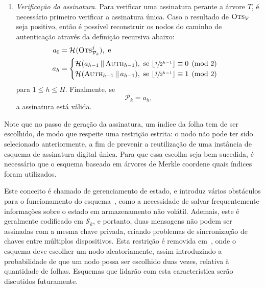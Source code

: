 \documentclass{ufsctex/ufsctex}
\newcommand{\pk}{\mathcal{P}_k}
\newcommand{\sk}{\mathcal{S}_k}
\newcommand{\hash}[2][]{\mathcal{H}^{#1} (#2)}
\newcommand{\concat}{\, \vert{} \vert{} \,}
\begin{document}
\begin{enumerate}
  \item[] \emph{Verificação da assinatura.} Para verificar uma assinatura
      perante a árvore $T$, é necessário primeiro verificar a assinatura única.
        Caso o resultado de $\textsc{Ots}_{\mathcal{V}}$ seja positivo, então é
        possível reconstruir os nodos do caminho de autenticação através da
        definição recursiva abaixo:
        \begin{equation}
          \begin{split}
            a_{0} &= \hash{\textsc{Ots}_{\pk{}}^{j}}, \text{ e } \\
            a_{h} &=
            \begin{cases}
              \hash{a_{h - 1} \concat \textsc{Auth}_{h - 1}}, \text{ se }
                \lfloor \sfrac{j}{2^{h - 1}} \rfloor \equiv 0 \pmod{2} \\
              \hash{\textsc{Auth}_{h - 1} \concat a_{h - 1}}, \text{ se }
                \lfloor \sfrac{j}{2^{h - 1}} \rfloor \equiv 1 \pmod{2} \\
            \end{cases}
          \end{split}
        \end{equation}
        para $1 \leq h \leq H$. Finalmente, se
        \begin{equation}
          \pk{} = a_{h},
        \end{equation}
        a assinatura está válida.

\end{enumerate}

Note que no passo de geração da assinatura, um índice da folha tem de ser
escolhido, de modo que respeite uma restrição estrita: o nodo não pode ter sido
selecionado anteriormente, a fim de prevenir a reutilização de uma instância de
esquema de assinatura digital única. Para que essa escolha seja bem sucedida, é
necessário que o esquema baseado em árvores de Merkle coordene quais índices
foram utilizados.

Este conceito é chamado de gerenciamento de estado, e introduz vários
obstáculos para o funcionamento do esquema~\cite{McGrew:inproc:2016:nov}, como
a necessidade de salvar frequentemente informações sobre o estado em
armazenamento não volátil. Ademais, este é geralmente codificado em $\sk{}$, e
portanto, duas mensagens não podem ser assinadas com a mesma chave privada,
criando problemas de sincronização de chaves entre múltiplos dispositivos. Esta
restrição é removida em~\cite[Construção 6.4.16]{Goldreich:book:2004}, onde o
esquema deve escolher um nodo aleatoriamente, assim introduzindo a
probabilidade de que um nodo possa ser escolhido duas vezes, relativa à
quantidade de folhas. Esquemas que lidarão com esta característica serão
discutidos futuramente.
\end{document}

